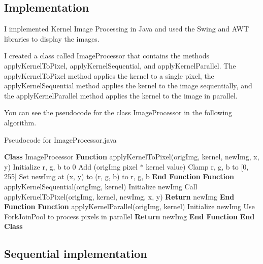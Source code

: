 \documentclass{article}
\begin{document}
\begin{multicols}{2}
    \section{Implementation}
    I implemented Kernel Image Processing in Java and used the Swing and AWT libraries to display the images.

    I created a class called ImageProcessor that contains the methods applyKernelToPixel, applyKernelSequential, and applyKernelParallel. The applyKernelToPixel method applies the kernel to a single pixel, the applyKernelSequential method applies the kernel to the image sequentially, and the applyKernelParallel method applies the kernel to the image in parallel.

    You can see the pseudocode for the class ImageProcessor in the following algorithm.

    \begin{algorithm}[H]
        \caption{Pseudocode for ImageProcessor.java}
        \raggedright
        \begin{algorithmic}[1]
            \State \textbf{Class} ImageProcessor
            \State
            \State \textbf{Function} applyKernelToPixel(origImg, kernel, newImg, x, y)
            \State Initialize r, g, b to 0
            \State Add (origImg pixel \(*\) kernel value)
            \EndFor
            \State Clamp r, g, b to [0, 255]
            \State Set newImg at (x, y) to (r, g, b) to r, g, b
            \State \textbf{End Function}
            \State
            \State \textbf{Function} applyKernelSequential(origImg, kernel)
            \State Initialize newImg
            \State Call applyKernelToPixel(origImg, kernel, newImg, x, y)
            \EndFor
            \State \textbf{Return} newImg
            \State \textbf{End Function}
            \State
            \State \textbf{Function} applyKernelParallel(origImg, kernel)
            \State Initialize newImg
            \State Use ForkJoinPool to process pixels in parallel
            \State \textbf{Return} newImg
            \State \textbf{End Function}
            \State
            \State \textbf{End Class}
        \end{algorithmic}
    \end{algorithm}

    \subsection{Sequential implementation}


\end{multicols}
\end{document}
